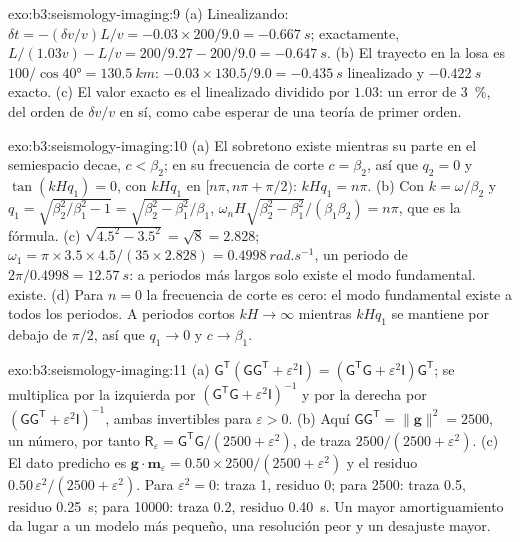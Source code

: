 \begin{solution}{exo:b3:seismology-imaging:9}
(a) Linealizando: $\delta t = -(\delta v/v)L/v = -0.03\times200/9.0 =
\qty{-0.667}{s}$; exactamente, $L/(1.03v) - L/v = 200/9.27 - 200/9.0 =
\qty{-0.647}{s}$. (b) El trayecto en la losa es $100/\cos\ang{40} =
\qty{130.5}{km}$: $-0.03\times130.5/9.0 = \qty{-0.435}{s}$ linealizado y
$\qty{-0.422}{s}$ exacto. (c) El valor exacto es el linealizado dividido por
$1.03$: un error de \qty{3}{\percent}, del orden de $\delta v/v$ en sí, como
cabe esperar de una teoría de primer orden.
\end{solution}

\begin{solution}{exo:b3:seismology-imaging:10}
(a) El sobretono existe mientras su parte en el semiespacio decae, $c < \beta_2$; en su
frecuencia de corte $c = \beta_2$, así que $q_2 = 0$ y $\tan(kHq_1) = 0$, con $kHq_1$ en
$[n\pi, n\pi + \pi/2)$: $kHq_1 = n\pi$. (b) Con $k = \omega/\beta_2$ y
$q_1 = \sqrt{\beta_2^2/\beta_1^2 - 1} = \sqrt{\beta_2^2 - \beta_1^2}/\beta_1$,
$\omega_nH\sqrt{\beta_2^2 - \beta_1^2}/(\beta_1\beta_2) = n\pi$, que es la
fórmula. (c) $\sqrt{4.5^2 - 3.5^2} = \sqrt8 = 2.828$; $\omega_1 =
\pi\times3.5\times4.5/(35\times2.828) = \qty{0.4998}{rad.s^{-1}}$, un periodo de
$2\pi/0.4998 = \qty{12.57}{s}$: a periodos más largos solo existe el modo fundamental.
existe. (d) Para $n = 0$ la frecuencia de corte es cero: el modo fundamental
existe a todos los periodos. A periodos cortos $kH \to \infty$ mientras $kHq_1$ se mantiene
por debajo de $\pi/2$, así que $q_1 \to 0$ y $c \to \beta_1$.
\end{solution}

\begin{solution}{exo:b3:seismology-imaging:11}
(a) $\mathsf G^{\mathsf T}(\mathsf G\mathsf G^{\mathsf T} + \varepsilon^2\mathsf I)
= (\mathsf G^{\mathsf T}\mathsf G + \varepsilon^2\mathsf I)\mathsf G^{\mathsf T}$;
se multiplica por la izquierda por $(\mathsf G^{\mathsf T}\mathsf G + \varepsilon^2
\mathsf I)^{-1}$ y por la derecha por $(\mathsf G\mathsf G^{\mathsf T} +
\varepsilon^2\mathsf I)^{-1}$, ambas invertibles para $\varepsilon > 0$.
(b) Aquí $\mathsf G\mathsf G^{\mathsf T} = \|\mathbf g\|^2 = 2500$, un número,
por tanto $\mathsf R_\varepsilon = \mathsf G^{\mathsf T}\mathsf G/(2500 + \varepsilon^2)$,
de traza $2500/(2500 + \varepsilon^2)$. (c) El dato predicho es
$\mathbf g\cdot\mathbf m_\varepsilon = 0.50\times2500/(2500 + \varepsilon^2)$
y el residuo $0.50\,\varepsilon^2/(2500 + \varepsilon^2)$. Para
$\varepsilon^2 = 0$: traza 1, residuo 0; para 2500: traza 0.5, residuo
\qty{0.25}{s}; para \num{10000}: traza 0.2, residuo \qty{0.40}{s}. Un mayor amortiguamiento
da lugar a un modelo más pequeño, una resolución peor y un desajuste mayor.
\end{solution}

